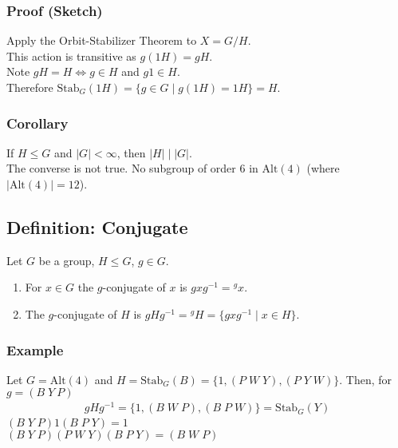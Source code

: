 \documentclass[11pt]{article}
\newcommand{\0}{\emptyset}
\begin{document}
\subsubsection*{Proof (Sketch)}
\label{sec:org089e6ec}
Apply the Orbit-Stabilizer Theorem to \(X=G/H\).\\[0pt]
This action is transitive as \(g(1H)=gH\).\\[0pt]
Note \(gH=H\iff g\in H\) and \(g1\in H\).\\[0pt]
Therefore \(\text{Stab}_{G}(1H)=\{g\in G\;|\;g(1H)=1H\}=H\).\\[0pt]
\subsubsection*{Corollary}
\label{sec:org42ef196}
If \(H\leq G\) and \(|G|<\infty\), then \(|H|\mid|G|\).\\[0pt]
The converse is not true. No subgroup of order \(6\) in \(\text{Alt}(4)\) (where \(|\text{Alt}(4)|=12\)).\\[0pt]
\subsection*{Definition: Conjugate}
\label{sec:org9d2280d}
Let \(G\)  be a group, \(H\leq G\), \(g\in G\).\\[0pt]
\begin{enumerate}
\item For \(x\in G\) the \(g\)-conjugate of \(x\) is \(gxg^{-1}={}^{g}x\).\\[0pt]
\item The \(g\)-conjugate of \(H\) is \(gHg^{-1}={}^{g}H=\{gxg^{-1}\;|\;x\in H\}\).\\[0pt]
\end{enumerate}
\subsubsection*{Example}
\label{sec:org4239d3e}
Let \(G=\text{Alt}(4)\) and \(H=\text{Stab}_{G}(B)=\{1,(P\;W\;Y),(P\;Y\;W)\}\). Then, for \(g=(B\;Y\:P)\)\\[0pt]
\begin{align*}
  gHg^{-1}=\{1,(B\;W\;P),(B\;P\;W)\}=\text{Stab}_{G}(Y)
\end{align*}
\((B\;Y\;P)1(B\;P\;Y)=1\)\\[0pt]
\((B\;Y\;P)(P\;W\;Y)(B\;P\;Y)=(B\;W\;P)\)\\[0pt]
\end{document}

